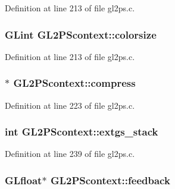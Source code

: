Definition at line 213 of file gl2ps.\+c.

\hypertarget{struct_g_l2_p_scontext_ac5aa29ee9da9691787e38a7f4b7590de}{}
\subsubsection[{colorsize}]{\setlength{\rightskip}{0pt plus 5cm}G\+Lint G\+L2\+P\+Scontext\+::colorsize}\label{struct_g_l2_p_scontext_ac5aa29ee9da9691787e38a7f4b7590de}


Definition at line 213 of file gl2ps.\+c.

\hypertarget{struct_g_l2_p_scontext_aaca54f23191e9f318f7394da342a9384}{}
\subsubsection[{compress}]{$\ast$ G\+L2\+P\+Scontext\+::compress}\label{struct_g_l2_p_scontext_aaca54f23191e9f318f7394da342a9384}


Definition at line 223 of file gl2ps.\+c.

\hypertarget{struct_g_l2_p_scontext_a9ba7595503ea6bc68d1ad39b02ec20c5}{}
\subsubsection[{extgs\+\_\+stack}]{\setlength{\rightskip}{0pt plus 5cm}int G\+L2\+P\+Scontext\+::extgs\+\_\+stack}\label{struct_g_l2_p_scontext_a9ba7595503ea6bc68d1ad39b02ec20c5}


Definition at line 239 of file gl2ps.\+c.

\hypertarget{struct_g_l2_p_scontext_a952fc0e5828ef69244b6257b80ae40b3}{}
\subsubsection[{feedback}]{\setlength{\rightskip}{0pt plus 5cm}G\+Lfloat$\ast$ G\+L2\+P\+Scontext\+::feedback}\label{struct_g_l2_p_scontext_a952fc0e5828ef69244b6257b80ae40b3}


